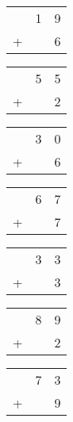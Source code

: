 \documentclass[12pt]{article}
\begin{document}
\begin{tabular}{c@{\,}c@{\,}c}
  & 1 & 9 \\
+ &   & 6 \\
\hline
\end{tabular}

\bigskip
\bigskip
\bigskip

\begin{tabular}{c@{\,}c@{\,}c}
  & 5 & 5 \\
+ &   & 2 \\
\hline
\end{tabular}

\bigskip
\bigskip
\bigskip

\begin{tabular}{c@{\,}c@{\,}c}
  & 3 & 0 \\
+ &   & 6 \\
\hline
\end{tabular}

\bigskip
\bigskip
\bigskip

\begin{tabular}{c@{\,}c@{\,}c}
  & 6 & 7 \\
+ &   & 7 \\
\hline
\end{tabular}

\bigskip
\bigskip
\bigskip

\begin{tabular}{c@{\,}c@{\,}c}
  & 3 & 3 \\
+ &   & 3 \\
\hline
\end{tabular}

\bigskip
\bigskip
\bigskip

\begin{tabular}{c@{\,}c@{\,}c}
  & 8 & 9 \\
+ &   & 2 \\
\hline
\end{tabular}

\bigskip
\bigskip
\bigskip

\begin{tabular}{c@{\,}c@{\,}c}
  & 7 & 3 \\
+ &   & 9 \\
\hline
\end{tabular}
\end{document}
